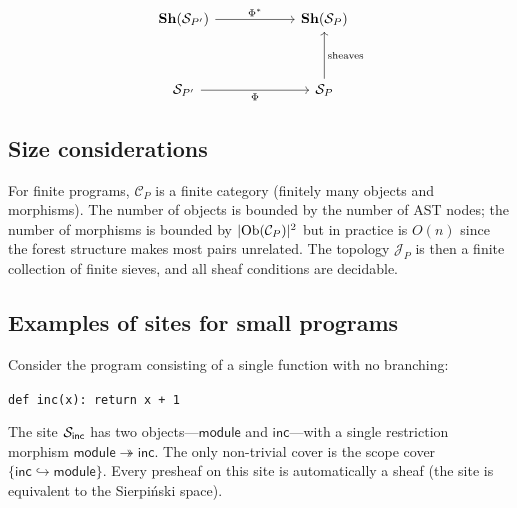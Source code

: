 \documentclass[11pt]{article}
\begin{document}
\[
\begin{tikzcd}[column sep=2cm, row sep=1.2cm]
  \mathbf{Sh}(\Site_{P'}) \arrow[r, "\Phi^*"]
  & \mathbf{Sh}(\Site_P) \\
  \Site_{P'} \arrow[r, "\Phi"']
  & \Site_P \arrow[u, "\text{sheaves}"']
\end{tikzcd}
\]

\subsection{Size considerations}

For finite programs, $\mathcal{C}_P$ is a finite category (finitely many
objects and morphisms).  The number of objects is bounded by the number of
AST nodes; the number of morphisms is bounded by $|\mathrm{Ob}(\mathcal{C}_P)|^2$
but in practice is $O(n)$ since the forest structure makes most pairs
unrelated.  The topology $\mathscr{J}_P$ is then a finite collection of
finite sieves, and all sheaf conditions are decidable.

\subsection{Examples of sites for small programs}

\begin{example}\label{ex:linear-site}
Consider the program consisting of a single function with no branching:
\begin{center}
\texttt{def inc(x): return x + 1}
\end{center}
The site $\mathcal{S}_{\mathsf{inc}}$ has two objects---$\mathsf{module}$ and
$\mathsf{inc}$---with a single restriction morphism
$\mathsf{module} \twoheadrightarrow \mathsf{inc}$.  The only non-trivial
cover is the scope cover $\{\mathsf{inc} \hookrightarrow \mathsf{module}\}$.
Every presheaf on this site is automatically a sheaf (the site is equivalent
to the Sierpi\'nski space).
\end{example}
\end{document}
